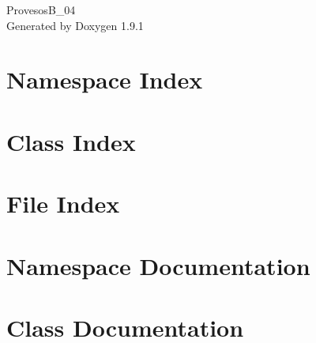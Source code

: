\let\mypdfximage\pdfximage\def\pdfximage{\immediate\mypdfximage}\documentclass[twoside]{book}
\newcommand{\+}{\discretionary{\mbox{\scriptsize$\hookleftarrow$}}{}{}}
\newcommand{\clearemptydoublepage}{%
  \newpage{\pagestyle{empty}\cleardoublepage}%
}
\begin{document}
\raggedbottom

\hypersetup{pageanchor=false,
             bookmarksnumbered=true,
             pdfencoding=unicode
            }
\begin{titlepage}
\vspace*{7cm}
\begin{center}%
{\Large Provesos\+B\+\_\+04 }\\
\vspace*{1cm}
{\large Generated by Doxygen 1.9.1}\\
\end{center}
\end{titlepage}
\clearemptydoublepage
{}
\tableofcontents
\clearemptydoublepage
{}
\hypersetup{pageanchor=true}

\chapter{Namespace Index}

\chapter{Class Index}

\chapter{File Index}

\chapter{Namespace Documentation}

\chapter{Class Documentation}




















\end{document}
